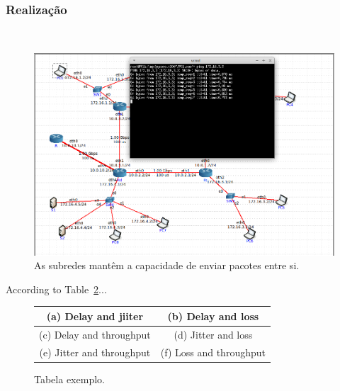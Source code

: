 \documentclass{llncs}
\begin{document}
\subsubsection{Realização}\rule[-10pt]{0pt}{10pt}\\ 


\begin{figure}
	\begin{center}
	\includegraphics[scale=0.35]{./imagens/exercicio3_3.png} 
	\end{center}
	\caption{\label{fig:ping}As subredes mantêm a capacidade de enviar pacotes entre si.}
\end{figure} 







According to Table~\ref{tab:TabelaExemplo}...

\begin{figure}
\centering
\begin{tabular}{|c|c|}\hline
(a) Delay and jiiter & (b) Delay and loss \\ \hline

(c) Delay and throughput & (d) Jitter and loss \\ \hline

(e) Jitter and throughput & (f) Loss and throughput \\ \hline
\end{tabular}
\caption{\label{tab:TabelaExemplo}Tabela exemplo.}
\end{figure}
\end{document}
